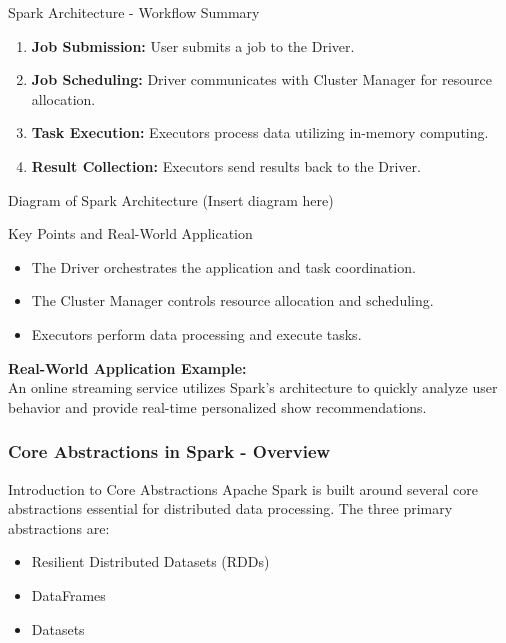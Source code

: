 \documentclass[aspectratio=169]{beamer}
\begin{document}
\begin{frame}[fragile]{Spark Architecture - Workflow Summary}
    \begin{enumerate}
        \item \textbf{Job Submission:} User submits a job to the Driver.
        \item \textbf{Job Scheduling:} Driver communicates with Cluster Manager for resource allocation.
        \item \textbf{Task Execution:} Executors process data utilizing in-memory computing.
        \item \textbf{Result Collection:} Executors send results back to the Driver.
    \end{enumerate}

    \begin{block}{Diagram of Spark Architecture}
        (Insert diagram here)
    \end{block}
\end{frame}

\begin{frame}[fragile]{Key Points and Real-World Application}
    \begin{itemize}
        \item The Driver orchestrates the application and task coordination.
        \item The Cluster Manager controls resource allocation and scheduling.
        \item Executors perform data processing and execute tasks.
    \end{itemize}
    
    \textbf{Real-World Application Example:} \\
    An online streaming service utilizes Spark’s architecture to quickly analyze user behavior and provide real-time personalized show recommendations.
\end{frame}

\begin{frame}[fragile]
    \frametitle{Core Abstractions in Spark - Overview}
    \begin{block}{Introduction to Core Abstractions}
        Apache Spark is built around several core abstractions essential for distributed data processing. 
        The three primary abstractions are:
        \begin{itemize}
            \item Resilient Distributed Datasets (RDDs)
            \item DataFrames
            \item Datasets
        \end{itemize}
    \end{block}
\end{frame}
\end{document}
